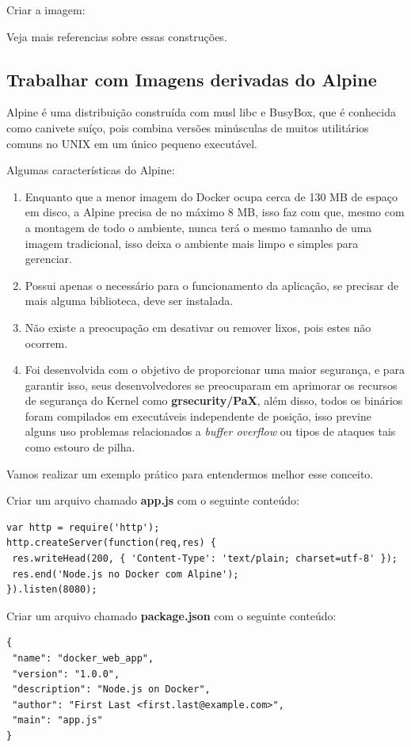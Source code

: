 \documentclass[a4paper,11pt]{article}
\begin{document}
Criar a imagem: \\

Veja mais referencias sobre essas construções\cite{constimagem}.

\subsection{Trabalhar com Imagens derivadas do Alpine}
Alpine é uma distribuição construída com musl libc e BusyBox, que é conhecida como canivete suíço, pois combina versões minúsculas de muitos utilitários comuns no UNIX em um único pequeno executável.

Algumas características do Alpine: \vspace{-1em}
\begin{enumerate}
  \item Enquanto que a menor imagem do Docker ocupa cerca de 130 MB de espaço em disco, a Alpine precisa de no máximo 8 MB, isso faz com que, mesmo com a montagem de todo o ambiente, nunca terá o mesmo tamanho de uma imagem tradicional, isso deixa o ambiente mais limpo e simples para gerenciar.
  \item Possui apenas o necessário para o funcionamento da aplicação, se precisar de mais alguma biblioteca, deve ser instalada.
  \item Não existe a preocupação em desativar ou remover lixos, pois estes não ocorrem.
  \item Foi desenvolvida com o objetivo de proporcionar uma maior segurança, e para garantir isso, seus desenvolvedores se preocuparam em aprimorar os recursos de segurança do Kernel como \textbf{grsecurity/PaX}, além disso, todos os binários foram compilados em executáveis independente de posição, isso previne alguns uso problemas relacionados a \textit{buffer overflow} ou tipos de ataques tais como estouro de pilha.
\end{enumerate}

Vamos realizar um exemplo prático para entendermos melhor esse conceito.

Criar um arquivo chamado \textbf{app.js} com o seguinte conteúdo:
\begin{lstlisting}[]
var http = require('http');
http.createServer(function(req,res) {
 res.writeHead(200, { 'Content-Type': 'text/plain; charset=utf-8' });
 res.end('Node.js no Docker com Alpine');
}).listen(8080);
\end{lstlisting}

Criar um arquivo chamado \textbf{package.json} com o seguinte conteúdo:
\begin{lstlisting}[]
{
 "name": "docker_web_app",
 "version": "1.0.0",
 "description": "Node.js on Docker",
 "author": "First Last <first.last@example.com>",
 "main": "app.js"
}
\end{lstlisting}
\end{document}
